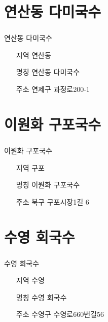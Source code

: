 \documentclass[aspectratio=1610,17pt,xcolor=pdftex,dvipsnames,table,handout]{beamer}
\begin{document}
		\section{ 연산동 다미국수	}
		\begin{frame} [t,plain]
		\frametitle{ }
			\begin{block} {연산동 다미국수	}
			\setlength{\leftmargini}{4em}			
			\begin{itemize}
				\item [지역] 연산동	
				\item [명칭] 연산동 다미국수	
				\item [주소] 연제구 과정로200-1
			\end{itemize}
			\end{block}						
		\end{frame}						

		\section{ 이원화 구포국수	}
		\begin{frame} [t,plain]
		\frametitle{ }
			\begin{block} {	이원화 구포국수	}
			\setlength{\leftmargini}{4em}			
			\begin{itemize}
				\item [지역] 구포	
				\item [명칭] 이원화 구포국수	
				\item [주소] 북구 구포시장1길 6
			\end{itemize}
			\end{block}						
		\end{frame}						


		\section{ 수영 회국수	}
		\begin{frame} [t,plain]
		\frametitle{ }
			\begin{block} {	수영 회국수	}
			\setlength{\leftmargini}{4em}			
			\begin{itemize}
				\item [지역] 수영	
				\item [명칭] 수영 회국수	
				\item [주소] 수영구 수영로660번길56	
			\end{itemize}
			\end{block}						
		\end{frame}						
\end{document}
